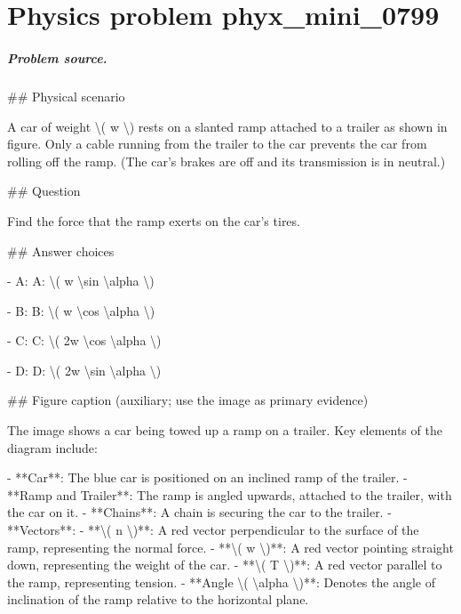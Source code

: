 
\chapter{Physics problem phyx\_mini\_0799}
\label{ch:PhyXMiniProblems_problem_phyx_mini_0799}

\paragraph{Problem source.}
\#\# Physical scenario

A car of weight \textbackslash{}( w \textbackslash{}) rests on a slanted ramp attached to a trailer as shown in figure. Only a cable running from the trailer to the car prevents the car from rolling off the ramp. (The car's brakes are off and its transmission is in neutral.)

\#\# Question

Find the force that the ramp exerts on the car's tires.

\#\# Answer choices

- A: A: \textbackslash{}( w \textbackslash{}sin \textbackslash{}alpha \textbackslash{})

- B: B: \textbackslash{}( w \textbackslash{}cos \textbackslash{}alpha \textbackslash{})

- C: C: \textbackslash{}( 2w \textbackslash{}cos \textbackslash{}alpha \textbackslash{})

- D: D: \textbackslash{}( 2w \textbackslash{}sin \textbackslash{}alpha \textbackslash{})

\#\# Figure caption (auxiliary; use the image as primary evidence)

The image shows a car being towed up a ramp on a trailer. Key elements of the diagram include:

- **Car**: The blue car is positioned on an inclined ramp of the trailer.
- **Ramp and Trailer**: The ramp is angled upwards, attached to the trailer, with the car on it.
- **Chains**: A chain is securing the car to the trailer.
- **Vectors**:
  - **\textbackslash{}( n \textbackslash{})**: A red vector perpendicular to the surface of the ramp, representing the normal force.
  - **\textbackslash{}( w \textbackslash{})**: A red vector pointing straight down, representing the weight of the car.
  - **\textbackslash{}( T \textbackslash{})**: A red vector parallel to the ramp, representing tension.
- **Angle \textbackslash{}( \textbackslash{}alpha \textbackslash{})**: Denotes the angle of inclination of the ramp relative to the horizontal plane.

